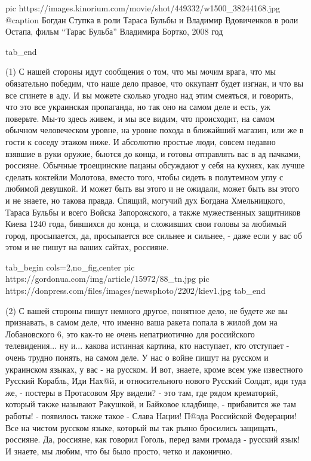 		 pic https://images.kinorium.com/movie/shot/449332/w1500_38244168.jpg
		 @caption Богдан Ступка в роли Тараса Бульбы и Владимир Вдовиченков в роли Остапа, фильм \enquote{Тарас Бульба} Владимира Бортко, 2008 год

  tab_end
\fi

(1) С нашей стороны идут сообщения о том, что мы мочим врага, что мы
обязательно победим, что наше дело правое, что оккупант будет изгнан, и что вы
все сгинете в аду. И вы можете сколько угодно над этим смеяться, и говорить,
что это все украинская пропаганда, но так оно на самом деле и есть, уж
поверьте.  Мы-то здесь живем, и мы все видим, что происходит, на самом обычном
человеческом уровне, на уровне похода в ближайший магазин, или же в гости к
соседу этажом ниже. И абсолютно простые люди, совсем недавно взявшие в руки
оружие, бьются до конца, и готовы отправлять вас в ад пачками, россияне.
Обычные троещинские пацаны обсуждают у себя на кухнях, как лучше сделать
коктейли Молотова, вместо того, чтобы сидеть в полутемном углу с любимой
девушкой. И может быть вы этого и не ожидали, может быть вы этого и не знаете,
но такова правда.  Спящий, могучий дух Богдана Хмельницкого, Тараса Бульбы и
всего Войска Запорожского, а также мужественных защитников Киева 1240 года,
бившихся до конца, и сложивших свои головы за любимый город, просыпается, да,
просыпается все сильнее и сильнее, - даже если у вас об этом и не пишут на
ваших сайтах, россияне.

\ifcmt
  tab_begin cols=2,no_fig,center
     pic https://gordonua.com/img/article/15972/88_tn.jpg
		 pic https://donpress.com/files/images/newsphoto/2202/kiev1.jpg
  tab_end
\fi

(2) С вашей стороны пишут немного другое, понятное дело, не будете же вы
признавать, в самом деле, что именно ваша ракета попала в жилой дом на
Лобановского 6, это как-то не очень непатриотично для российского
телевидения... ну и... какова истинная картина, кто наступает, кто отступает -
очень трудно понять, на самом деле. У нас о войне пишут на русском и украинском
языках, у вас - на русском. И вот, знаете, кроме всем уже известного Русский
Корабль, Иди Нах@й, и относительного нового Русский Солдат, иди туда же, -
постеры в Протасовом Яру видели? - это там, где рядом крематорий, который также
называют Ракушкой, и Байковое кладбище, - прибавится же там работы! - появилось
также такое - Слава Нации! П@зда Российской Федерации! Все на чистом русском
языке, который вы так ръяно бросились защищать, россияне. Да, россияне, как
говорил Гоголь, перед вами громада - русский язык! И знаете, мы любим, что бы
было просто, четко и лаконично.

